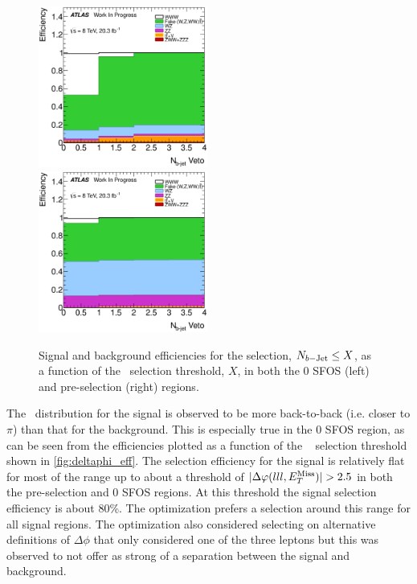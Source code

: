 \begin{figure}[ht!]
\centering
\includegraphics[width=0.495\textwidth]{figures/optimization/SignalRegionsPreselection_0SFOS_Efficiencies/NBTaggedJets_LeftCumulative.eps}
\includegraphics[width=0.495\textwidth]{figures/optimization/SignalRegions_0p5mmZ0_Preselection_Efficiencies/NBTaggedJets_LeftCumulative.eps}
\caption{ Signal and background efficiencies 
for the selection,
$N_{b-\textrm{Jet}} \leq X$,
as a function of the \nbjet~selection
threshold, $X$, in both the 0 SFOS (left) and pre-selection (right) regions.  }
\label{fig:nbjet_eff}
\end{figure}


The \deltaphi~distribution for the signal is observed to be more back-to-back
(i.e. closer to $\pi$)
than that for the background. This is especially true in the 0 SFOS
region, as can be seen from the efficiencies plotted 
as a function of the \deltaphi~
selection threshold shown in \fig\ref{fig:deltaphi_eff}.
The selection efficiency for the signal is relatively flat for
most of the range up to about 
a threshold of $|\deltaphi|>2.5$ in both the pre-selection and 0 SFOS
regions.  At this threshold the signal selection efficiency 
is about 80\%.  The optimization prefers a selection
around this range for all signal regions.
The optimization also considered selecting on alternative
definitions of $\Delta\phi$ that only considered one of the three
leptons but this was observed to not offer as strong of a separation
between the signal and background. %

